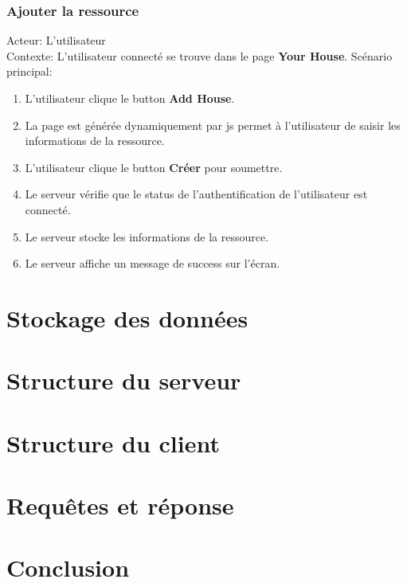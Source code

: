 \documentclass[14px]{article}
\begin{document}
\subsubsection{Ajouter la ressource}
Acteur: L'utilisateur\\
Contexte: L'utilisateur connecté se trouve dans le page \textbf{Your House}.
Scénario principal:
\begin{enumerate}
	\item L'utilisateur clique le button \textbf{Add House}.
	\item La page est générée dynamiquement par js permet à l'utilisateur de saisir les informations de la ressource.
	\item L'utilisateur clique le button \textbf{Créer} pour soumettre.
	\item Le serveur vérifie que le status de l'authentification de l'utilisateur est connecté.
	\item Le serveur stocke les informations de la ressource.
	\item Le serveur affiche un message de success sur l'écran.
\end{enumerate}



\section{Stockage des données}

\section{Structure du serveur}

\section{Structure du client}

\section{Requêtes et réponse}

\section{Conclusion}

	
\end{document}
